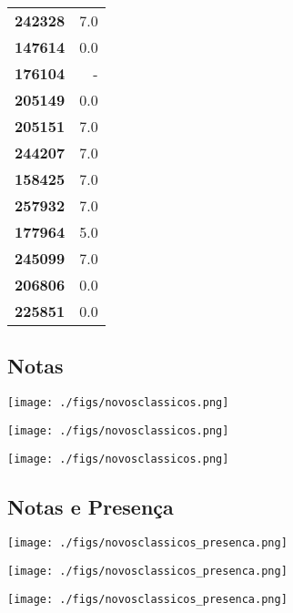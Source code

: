 \documentclass[11pt]{article}
\begin{document}
\begin{center}
\begin{longtable}{lr}
\textbf{242328} &                      7.0 \\
\textbf{147614} &                      0.0 \\
\textbf{176104} &                        - \\
\textbf{205149} &                      0.0 \\
\textbf{205151} &                      7.0 \\
\textbf{244207} &                      7.0 \\
\textbf{158425} &                      7.0 \\
\textbf{257932} &                      7.0 \\
\textbf{177964} &                      5.0 \\
\textbf{245099} &                      7.0 \\
\textbf{206806} &                      0.0 \\
\textbf{225851} &                      0.0 \\
\end{longtable}
\end{center}
\subsection{Notas}
\label{sec:orgb2114a1}
\begin{center}
\texttt{[image: ./figs/novosclassicos.png]}
\end{center}
\begin{center}
\texttt{[image: ./figs/novosclassicos.png]}
\end{center}
\begin{center}
\texttt{[image: ./figs/novosclassicos.png]}
\end{center}


\subsection{Notas e Presença}
\label{sec:org35d5dcd}
\begin{center}
\texttt{[image: ./figs/novosclassicos\_presenca.png]}
\end{center}
\begin{center}
\texttt{[image: ./figs/novosclassicos\_presenca.png]}
\end{center}
\begin{center}
\texttt{[image: ./figs/novosclassicos\_presenca.png]}
\end{center}
\end{document}
